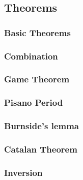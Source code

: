 \subsection{Theorems}
\subsubsection{Basic Theorems}


\subsubsection{Combination}


\subsubsection{Game Theorem}


\subsubsection{Pisano Period}


\subsubsection{Burnside's lemma}


\subsubsection{Catalan Theorem}


\subsubsection{Inversion}
